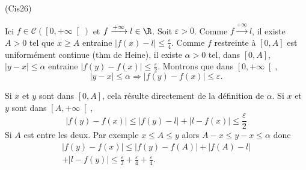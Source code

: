 \begin{tiny}(Cis26)\end{tiny} Ici $f \in \mathcal{C}(\left[0, +\infty\right[)$ et $f \xrightarrow{+\infty} l\in \R$.
Soit $\varepsilon > 0$.
Comme $f \xrightarrow{+\infty} l$, il existe $A > 0$ tel que $x \geq A$ entraine $\left| f(x) - l \right| \leq \frac{\varepsilon}{4}$.\newline
Comme $f$ restreinte à $\left[0, A \right]$ est uniformément continue (thm de Heine), il existe $\alpha > 0$ tel, dans $\left[ 0, A\right]$, $
  |y-x| \leq \alpha$ entraine $\left| f(y) - f(x) \right| \leq \frac{\varepsilon}{2}$.\newline
Montrons que dans $\left[ 0, +\infty \right[$,
 \[
|y-x| \leq \alpha \Rightarrow \left| f(y) - f(x) \right| \leq \varepsilon .
\]

Si $x$ et $y$ sont dans $\left[ 0, A\right]$, cela résulte directement de la définition de $\alpha$.\newline 
Si $x$ et $y$ sont dans $\left[ A, +\infty\right[$,
\[
  \left| f(y) - f(x) \right| \leq \left| f(y) - l \right| + \left| l - f(x) \right| \leq \frac{\varepsilon}{2}
\]
  Si $A$ est entre les deux. Par exemple $x \leq A \leq y$ alors $A - x \leq y -x \leq \alpha$ donc
\begin{multline*}
  \left| f(y) - f(x) \right| \leq \left| f(y) - f(A) \right| + \left| f(A) - l \right| \\
  + \left| l - f(y)\right| \leq \frac{\varepsilon}{2} + \frac{\varepsilon}{4} + \frac{\varepsilon}{4}.
\end{multline*}
